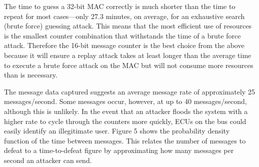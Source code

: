 
The time to guess a 32-bit MAC correctly is much shorter than the time to repeat for most cases---only 27.3 minutes, on average, for an exhaustive search (brute force) guessing attack. This means that the most efficient use of resources is the smallest counter combination that withstands the time of a brute force attack. Therefore the 16-bit message counter is the best choice from the above because it will ensure a replay attack takes at least longer than the average time to execute a brute force attack on the MAC but will not consume more resources than is necessary.

The message data captured suggests an average message rate of approximately 25 messages/second. Some messages occur, however, at up to 40 messages/second, although this is unlikely. In the event that an attacker floods the system with a higher rate to cycle through the counters more quickly, ECUs on the bus could easily identify an illegitimate user. Figure 5 shows the probability density function of the time between messages. This relates the number of messages to defeat to a time-to-defeat figure by approximating how many messages per second an attacker can send.



